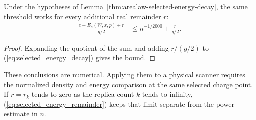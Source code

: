 \begin{lemma}
    \label{thm:arealaw-selected-energy-remainder}
    \leanok
    Under the hypotheses of Lemma~\ref{thm:arealaw-selected-energy-decay},
    the same threshold works for every additional real remainder $r$:
    \begin{align}
        \frac{e+E_n(W,x,p)+r}{g/2}
         & \leq n^{-1/2000}+\frac r{g/2}.
        \label{eq:selected_energy_remainder}
    \end{align}
\end{lemma}

\begin{proof}
    \leanok
    Expanding the quotient of the sum and adding $r/(g/2)$ to
    (\ref{eq:selected_energy_decay}) gives the bound.
\end{proof}

These conclusions are numerical. Applying them to a physical scanner
requires the normalized density and energy comparison at the same selected
charge point. If $r=r_k$ tends to zero as the replica count $k$ tends to
infinity, (\ref{eq:selected_energy_remainder}) keeps that limit separate
from the power estimate in $n$.
